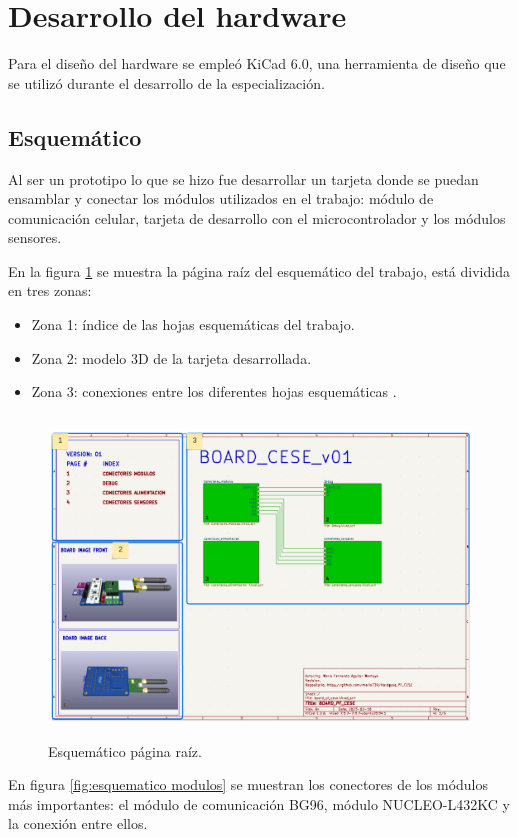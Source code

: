 \section{Desarrollo del hardware}

Para el diseño del hardware se empleó KiCad 6.0, una herramienta de diseño que se utilizó durante el desarrollo de la especialización.

\subsection{Esquemático} 
Al ser un prototipo lo que se hizo fue desarrollar un tarjeta donde se puedan ensamblar y conectar los módulos utilizados en el trabajo: módulo de comunicación celular, tarjeta de desarrollo con el microcontrolador y  los módulos sensores.

En la figura \ref{fig:esquematico root} se muestra la página raíz del esquemático del trabajo, está dividida en tres zonas:
\begin{itemize}
  \item Zona 1: índice de las hojas esquemáticas del trabajo.
  \item Zona 2: modelo 3D de la tarjeta desarrollada.
  \item Zona 3: conexiones entre los diferentes hojas esquemáticas .
\end{itemize}

\begin{figure}[h]
  \centering
	\includegraphics[width=\textwidth, height=8.5cm]{./Figures/esquematico_raiz.png}
	\caption{Esquemático página raíz.}
	\label{fig:esquematico root}
\end{figure}

En figura \ref{fig:esquematico modulos} se muestran los conectores de los módulos más importantes: el módulo de comunicación BG96, módulo NUCLEO-L432KC y la conexión entre ellos.

